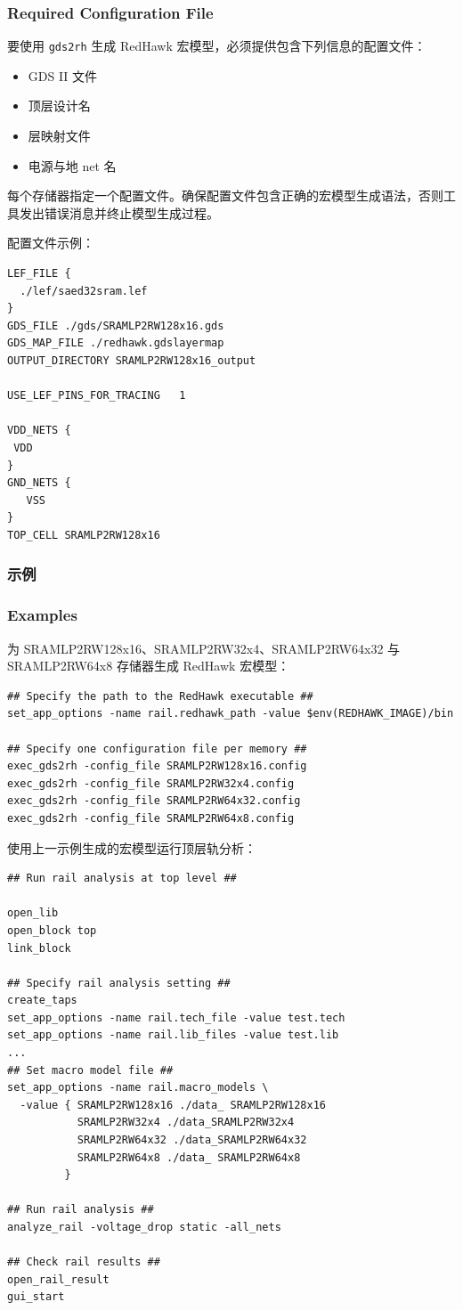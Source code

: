 \subsubsection*{Required Configuration File}

要使用 \texttt{gds2rh} 生成 RedHawk 宏模型，必须提供包含下列信息的配置文件：
\begin{itemize}
  \item GDS II 文件
  \item 顶层设计名
  \item 层映射文件
  \item 电源与地 net 名
\end{itemize}

每个存储器指定一个配置文件。确保配置文件包含正确的宏模型生成语法，否则工具发出错误消息并终止模型生成过程。

配置文件示例：
\begin{lstlisting}
LEF_FILE {
  ./lef/saed32sram.lef
}
GDS_FILE ./gds/SRAMLP2RW128x16.gds
GDS_MAP_FILE ./redhawk.gdslayermap
OUTPUT_DIRECTORY SRAMLP2RW128x16_output

USE_LEF_PINS_FOR_TRACING   1

VDD_NETS {
 VDD
}
GND_NETS {
   VSS
}
TOP_CELL SRAMLP2RW128x16
\end{lstlisting}

\subsubsection{示例}
\subsubsection*{Examples}

为 SRAMLP2RW128x16、SRAMLP2RW32x4、SRAMLP2RW64x32 与 SRAMLP2RW64x8 存储器生成 RedHawk 宏模型：
\begin{lstlisting}
## Specify the path to the RedHawk executable ##
set_app_options -name rail.redhawk_path -value $env(REDHAWK_IMAGE)/bin

## Specify one configuration file per memory ##
exec_gds2rh -config_file SRAMLP2RW128x16.config
exec_gds2rh -config_file SRAMLP2RW32x4.config
exec_gds2rh -config_file SRAMLP2RW64x32.config
exec_gds2rh -config_file SRAMLP2RW64x8.config
\end{lstlisting}

使用上一示例生成的宏模型运行顶层轨分析：
\begin{lstlisting}
## Run rail analysis at top level ##

open_lib
open_block top
link_block

## Specify rail analysis setting ##
create_taps
set_app_options -name rail.tech_file -value test.tech
set_app_options -name rail.lib_files -value test.lib
...
## Set macro model file ##
set_app_options -name rail.macro_models \
  -value { SRAMLP2RW128x16 ./data_ SRAMLP2RW128x16
           SRAMLP2RW32x4 ./data_SRAMLP2RW32x4
           SRAMLP2RW64x32 ./data_SRAMLP2RW64x32
           SRAMLP2RW64x8 ./data_ SRAMLP2RW64x8
         }

## Run rail analysis ##
analyze_rail -voltage_drop static -all_nets

## Check rail results ##
open_rail_result
gui_start
\end{lstlisting}

